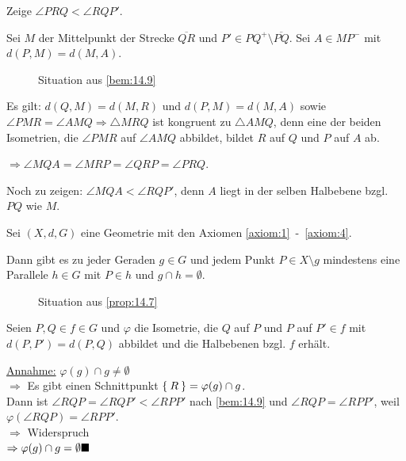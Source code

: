 \begin{beweis}
    Zeige $\angle PRQ < \angle RQP'$.

    Sei $M$ der Mittelpunkt der Strecke $\overline{QR}$ und $P' \in PQ^+ \setminus \overline{PQ}$.
    Sei $A \in MP^-$ mit $d(P,M) = d(M,A)$.


    \begin{figure}[ht]
        \centering

        \label{fig:winkel-und-parallelogramm}
        \caption{Situation aus \cref{bem:14.9}}
    \end{figure}

    Es gilt: $d(Q,M) = d(M,R)$ und $d(P,M) = d(M,A)$ sowie
    $\angle PMR = \angle AMQ \Rightarrow \triangle MRQ$ ist
    kongruent zu $\triangle AMQ$, denn eine der beiden Isometrien, die
    $\angle PMR$ auf $\angle AMQ$ abbildet, bildet $R$ auf $Q$ und
    $P$ auf $A$ ab.

    $\Rightarrow \angle MQA = \angle MRP = \angle QRP = \angle PRQ$.

    Noch zu zeigen: $\angle MQA < \angle RQP'$, denn $A$ liegt in der
    selben Halbebene bzgl. $PQ$ wie $M$.
\end{beweis}

\begin{proposition}\label{prop:14.7}%
    Sei $(X, d, G)$ eine Geometrie mit den Axiomen \ref{axiom:1}~-~\ref{axiom:4}.

    Dann gibt es zu jeder Geraden $g \in G$ und jedem Punkt $P \in X \setminus g$
    mindestens eine Parallele $h \in G$ mit $P \in h$ und $g \cap h = \emptyset$.
\end{proposition}

\begin{figure}[htp]
    \centering
    
    \caption{Situation aus \cref{prop:14.7}}
    \label{fig:geometry-6}
\end{figure}

\begin{beweis}
    Seien $P, Q \in f \in G$ und $\varphi$ die Isometrie, die $Q$ auf $P$ und $P$ auf $P' \in f$
    mit $d(P,P') = d(P, Q)$ abbildet und die Halbebenen bzgl. $f$ erhält.

    \underline{Annahme:} $\varphi(g) \cap g \neq \emptyset$\\
    $\Rightarrow$ Es gibt einen Schnittpunkt $\Set{R} = \varphi(g) \cap g$.\\
    Dann ist $\angle RQP = \angle RQP' < \angle RPP'$ nach
    \cref{bem:14.9} und $\angle RQP = \angle RPP'$, weil
    $\varphi(\angle RQP) = \angle RPP'$.\\
    $\Rightarrow$ Widerspruch\\
    $\Rightarrow \varphi(g) \cap g = \emptyset \qed$
\end{beweis}

